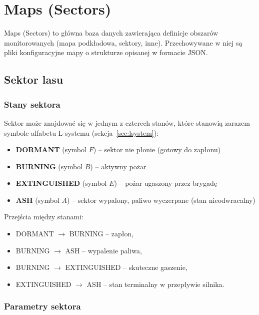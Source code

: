 \section*{Maps (Sectors)}
Maps (Sectors) to główna baza danych zawierająca definicje obszarów monitorowanych (mapa podkładowa, sektory, inne). Przechowywane w niej są pliki konfiguracyjne mapy o strukturze opisanej w formacie JSON.  


\subsection{Sektor lasu}

\subsubsection{Stany sektora}




Sektor może znajdować się w jednym z czterech stanów, które stanowią zarazem symbole alfabetu L-systemu (sekcja~\ref{sec:lsystem}):
\begin{itemize}
    \item \textbf{DORMANT} (symbol $F$) -- sektor nie płonie (gotowy do zapłonu)
    \item \textbf{BURNING} (symbol $B$) -- aktywny pożar
    \item \textbf{EXTINGUISHED} (symbol $E$) -- pożar ugaszony przez brygadę
    \item \textbf{ASH} (symbol $A$) -- sektor wypalony, paliwo wyczerpane (stan nieodwracalny)
\end{itemize}

Przejścia między stanami:
\begin{itemize}
    \item DORMANT $\rightarrow$ BURNING -- zapłon,
    \item BURNING $\rightarrow$ ASH -- wypalenie paliwa,
    \item BURNING $\rightarrow$ EXTINGUISHED -- skuteczne gaszenie,
    \item EXTINGUISHED $\rightarrow$ ASH -- stan terminalny w przepływie silnika.
\end{itemize}

\subsubsection{Parametry sektora}

